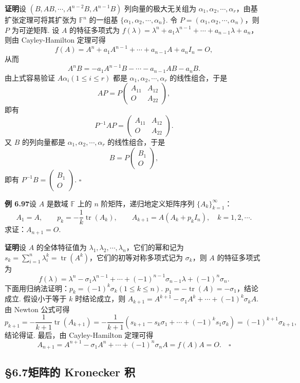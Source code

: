 \documentclass[UTF8,12pt,a4paper,fontset=fandol]{ctexart}
\begin{document}
\noindent\textbf{证明}\quad 设 $(B,AB,\cdots,A^{n-2}B,A^{n-1}B)$ 列向量的极大无关组为 $\alpha_1,\alpha_2,\cdots,\alpha_r$，由基扩张定理可将其扩张为 $\mathbb{F}^n$ 的一组基 $\{\alpha_1,\alpha_2,\cdots,\alpha_n\}$. 令 $P=(\alpha_1,\alpha_2,\cdots,\alpha_n)$，则 $P$ 为可逆矩阵. 设 $A$ 的特征多项式为 $f(\lambda)=\lambda^n+a_1\lambda^{n-1}+\cdots+a_{n-1}\lambda+a_n$，则由 Cayley-Hamilton 定理可得
\[
f(A)=A^n+a_1A^{n-1}+\cdots+a_{n-1}A+a_nI_n=O,
\]
从而
\[
A^nB=-a_1A^{n-1}B-\cdots-a_{n-1}AB-a_nB.
\]
由上式容易验证 $A\alpha_i(1\le i\le r)$ 都是 $\alpha_1,\alpha_2,\cdots,\alpha_r$ 的线性组合，于是
\[
AP=P\begin{pmatrix} A_{11}&A_{12}\\ O&A_{22}\end{pmatrix},
\]
即有
\[
P^{-1}AP=\begin{pmatrix} A_{11}&A_{12}\\ O&A_{22}\end{pmatrix}.
\]
又 $B$ 的列向量都是 $\alpha_1,\alpha_2,\cdots,\alpha_r$ 的线性组合，于是
\[
B=P\begin{pmatrix} B_1\\ O\end{pmatrix},
\]
即有 $P^{-1}B=\begin{pmatrix} B_1\\ O\end{pmatrix}$. $\square$

\noindent\textbf{例 6.97}\quad 设 $A$ 是数域 $\mathbb{F}$ 上的 $n$ 阶矩阵，递归地定义矩阵序列 $\{A_k\}_{k=1}^{\infty}$：
\[
A_1=A,\qquad p_k=-\frac{1}{k}\operatorname{tr}(A_k),\qquad A_{k+1}=A(A_k+p_kI_n),\quad k=1,2,\cdots.
\]
求证：$A_{n+1}=O$.

\noindent\textbf{证明}\quad 设 $A$ 的全体特征值为 $\lambda_1,\lambda_2,\cdots,\lambda_n$，它们的幂和记为 $s_k=\sum_{i=1}^n\lambda_i^k=\operatorname{tr}(A^k)$，它们的初等对称多项式记为 $\sigma_k$，则 $A$ 的特征多项式为
\[
f(\lambda)=\lambda^n-\sigma_1\lambda^{n-1}+\cdots+(-1)^{n-1}\sigma_{n-1}\lambda+(-1)^n\sigma_n.
\]
下面用归纳法证明：$p_k=(-1)^k\sigma_k(1\le k\le n)$. $p_1=-\operatorname{tr}(A)=-\sigma_1$，结论成立. 假设小于等于 $k$ 时结论成立，则 $A_{k+1}=A^{k+1}-\sigma_1A^k+\cdots+(-1)^k\sigma_kA$. 由 Newton 公式可得
\[
p_{k+1}=-\frac{1}{k+1}\operatorname{tr}(A_{k+1})
=-\frac{1}{k+1}(s_{k+1}-s_k\sigma_1+\cdots+(-1)^ks_1\sigma_k)
=(-1)^{k+1}\sigma_{k+1},
\]
结论得证. 最后，由 Cayley-Hamilton 定理可得
\[
A_{n+1}=A^{n+1}-\sigma_1A^n+\cdots+(-1)^n\sigma_nA=f(A)A=O. \quad \square
\]

\subsection*{§6.7\quad 矩阵的 Kronecker 积}
\end{document}
